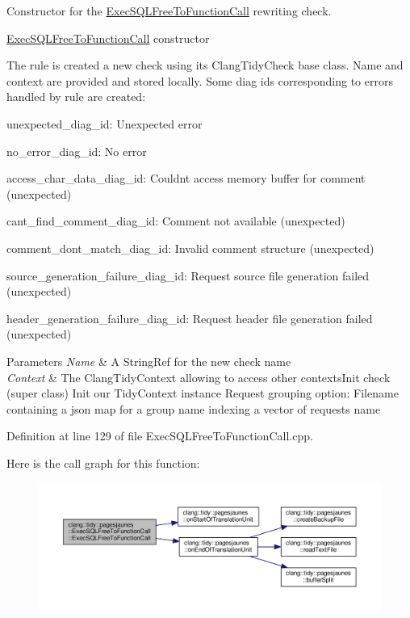 Constructor for the \hyperlink{classclang_1_1tidy_1_1pagesjaunes_1_1_exec_s_q_l_free_to_function_call}{Exec\+S\+Q\+L\+Free\+To\+Function\+Call} rewriting check. 

\hyperlink{classclang_1_1tidy_1_1pagesjaunes_1_1_exec_s_q_l_free_to_function_call}{Exec\+S\+Q\+L\+Free\+To\+Function\+Call} constructor

The rule is created a new check using its {\ttfamily Clang\+Tidy\+Check} base class. Name and context are provided and stored locally. Some diag ids corresponding to errors handled by rule are created\+:
\begin{DoxyItemize}
\item unexpected\+\_\+diag\+\_\+id\+: Unexpected error
\item no\+\_\+error\+\_\+diag\+\_\+id\+: No error
\item access\+\_\+char\+\_\+data\+\_\+diag\+\_\+id\+: Couldn\textquotesingle{}t access memory buffer for comment (unexpected)
\item cant\+\_\+find\+\_\+comment\+\_\+diag\+\_\+id\+: Comment not available (unexpected)
\item comment\+\_\+dont\+\_\+match\+\_\+diag\+\_\+id\+: Invalid comment structure (unexpected)
\item source\+\_\+generation\+\_\+failure\+\_\+diag\+\_\+id\+: Request source file generation failed (unexpected)
\item header\+\_\+generation\+\_\+failure\+\_\+diag\+\_\+id\+: Request header file generation failed (unexpected)
\end{DoxyItemize}


\begin{DoxyParams}{Parameters}
{\em Name} & A String\+Ref for the new check name \\
\hline
{\em Context} & The Clang\+Tidy\+Context allowing to access other contexts\+Init check (super class) Init our Tidy\+Context instance Request grouping option\+: Filename containing a json map for a group name indexing a vector of requests name \\
\hline
\end{DoxyParams}


Definition at line 129 of file Exec\+S\+Q\+L\+Free\+To\+Function\+Call.\+cpp.

Here is the call graph for this function\+:
\nopagebreak
\begin{figure}[H]
\begin{center}
\leavevmode
\includegraphics[width=350pt]{classclang_1_1tidy_1_1pagesjaunes_1_1_exec_s_q_l_free_to_function_call_a389597efb3707e3478b53bdfdbb35a97_cgraph}
\end{center}
\end{figure}


